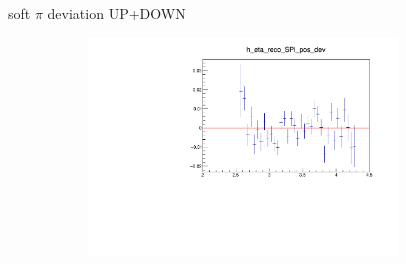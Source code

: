 \documentclass[11pt]{beamer}
\begin{document}
\begin{frame}{soft $\pi$ deviation UP+DOWN}
\begin{figure}
\begin{subfigure}{0.45\textwidth}
\end{subfigure}
\begin{subfigure}{0.45\textwidth}
\includegraphics[width=0.9\textwidth]{third/up_plus_down_pdf/eta_2.pdf}
\end{subfigure}
\end{figure}
\end{frame}
\end{document}
